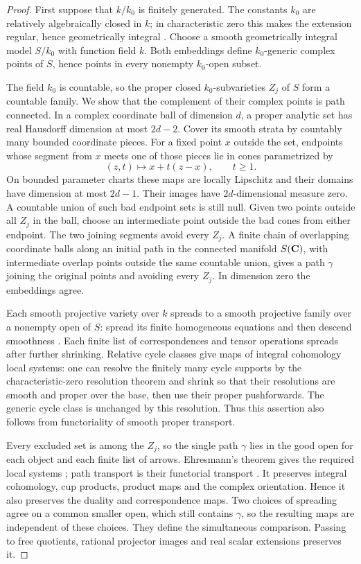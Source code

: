 \documentclass[11pt]{article}
\theoremstyle{definition}\newtheorem{definition}[theorem]{Definition}
\theoremstyle{remark}\newtheorem{remark}[theorem]{Remark}
\begin{document}
\begin{proof}
First suppose that $k/k_0$ is finitely generated. The constants $k_0$ are
relatively algebraically closed in $k$; in characteristic zero this makes
the extension regular, hence geometrically integral
\cite[Tag 037P and Section~10.45]{StacksE}. Choose a smooth geometrically integral model $S/k_0$
with function field $k$. Both embeddings define $k_0$-generic complex points
of $S$, hence points in every nonempty $k_0$-open subset.

The field $k_0$ is countable, so the proper closed $k_0$-subvarieties $Z_j$
of $S$ form a countable family. We show that the complement of their complex
points is path connected. In a complex coordinate ball of dimension $d$,
a proper analytic set has real Hausdorff dimension at most $2d-2$. Cover
its smooth strata by countably many bounded coordinate pieces. For a fixed
point $x$ outside the set, endpoints whose segment from $x$ meets one of
those pieces lie in cones parametrized by
\[
 (z,t)\longmapsto x+t(z-x),\qquad t\geq1.
\]
On bounded parameter charts these maps are locally Lipschitz and their
domains have dimension at most $2d-1$. Their images have $2d$-dimensional
measure zero. A countable union of such bad endpoint sets is still null.
Given two points outside all $Z_j$ in the ball, choose an intermediate point
outside the bad cones from either endpoint. The two joining segments avoid
every $Z_j$. A finite chain of overlapping coordinate balls along an initial
path in the connected manifold $S(\mathbf C)$, with intermediate overlap points
outside the same countable union, gives a path $\gamma$ joining the original
points and avoiding every $Z_j$. In dimension zero the embeddings agree.

Each smooth projective variety over $k$ spreads to a smooth projective family
over a nonempty open of $S$: spread its finite homogeneous equations and
then descend smoothness \cite[Tags 01ZM and 0C0C]{StacksE}.
Each finite list of correspondences and tensor operations spreads after
further shrinking. Relative cycle classes give
maps of integral cohomology local systems: one can resolve the finitely many
cycle supports by the characteristic-zero resolution theorem and shrink so that their resolutions
are smooth and proper over the base, then use their proper pushforwards.
The generic cycle class is unchanged by this resolution. Thus this assertion
also follows from functoriality of smooth proper transport.

Every excluded set is among the $Z_j$, so the single path $\gamma$ lies in
the good open for each object and each finite list of arrows. Ehresmann's
theorem gives the required local systems
\cite[Theorem~12.1.1, printed p.~97, PDF p.~98]{Arapura}; path transport
is their functorial transport
\cite[Theorem~12.3.1, printed p.~101, PDF p.~102]{Arapura}.
It preserves integral cohomology, cup products, product maps and the complex
orientation. Hence it also preserves the duality and correspondence maps.
Two choices of spreading agree on a common smaller open, which still
contains $\gamma$, so the resulting maps are independent of these choices.
They define the simultaneous comparison. Passing to free quotients, rational
projector images and real scalar extensions preserves it.


\end{proof}
\end{document}
